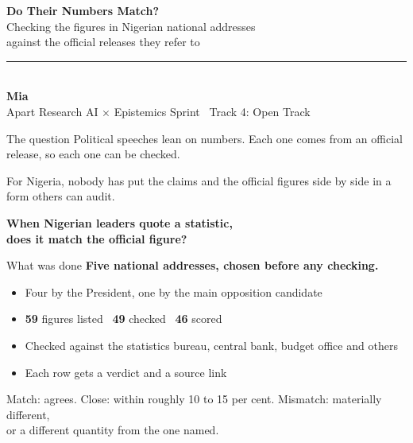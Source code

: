 \documentclass[aspectratio=169,12pt]{beamer}
\newcommand{\sm}[1]{{\small\color{muted}#1}}
\begin{document}
\begin{frame}[plain]
\vspace{1.0cm}
{\fontsize{30}{34}\selectfont\bfseries Do Their Numbers Match?}\\[0.45cm]
{\fontsize{13}{18}\selectfont Checking the figures in Nigerian national addresses\\ against the official releases they refer to}\\[0.75cm]
{\color{accent}\rule{1.6cm}{1.6pt}}\\[0.35cm]
{\fontsize{13}{16}\selectfont\bfseries Mia}\\[0.12cm]
{\fontsize{9}{12}\selectfont\color{muted}Apart Research AI × Epistemics Sprint \textbullet\ Track 4: Open Track}
\end{frame}

\begin{frame}{The question}
\vspace{0.3cm}
Political speeches lean on numbers. Each one comes from an official release, so each one can be checked.

For Nigeria, nobody has put the claims and the official figures side by side in a form others can audit.

\vspace{0.4cm}
{\Large\bfseries\color{accent}When Nigerian leaders quote a statistic,\\ does it match the official figure?}
\end{frame}

\begin{frame}{What was done}
\textbf{Five national addresses, chosen before any checking.}
\vspace{0.1cm}
\begin{itemize}\setlength{\itemsep}{7pt}
\item Four by the President, one by the main opposition candidate
\item \textbf{59} figures listed \textbullet\ \textbf{49} checked \textbullet\ \textbf{46} scored
\item Checked against the statistics bureau, central bank, budget office and others
\item Each row gets a verdict and a source link
\end{itemize}
\vspace{0.25cm}
\sm{Match: agrees. Close: within roughly 10 to 15 per cent. Mismatch: materially different,\\ or a different quantity from the one named.}
\end{frame}
\end{document}
